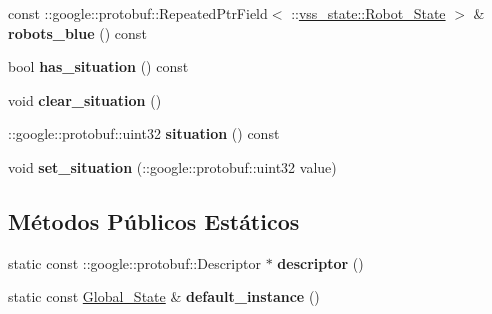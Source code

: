 \begin{DoxyCompactItemize}
\item 
const \+::google\+::protobuf\+::\+Repeated\+Ptr\+Field$<$ \+::\hyperlink{classvss__state_1_1Robot__State}{vss\+\_\+state\+::\+Robot\+\_\+\+State} $>$ \& {\bfseries robots\+\_\+blue} () const \hypertarget{classvss__state_1_1Global__State_ad659e30adf37a0e412765337eb28f233}{}\label{classvss__state_1_1Global__State_ad659e30adf37a0e412765337eb28f233}

\item 
bool {\bfseries has\+\_\+situation} () const \hypertarget{classvss__state_1_1Global__State_a261f48529a5cb4bc9d4cc9ba645e530b}{}\label{classvss__state_1_1Global__State_a261f48529a5cb4bc9d4cc9ba645e530b}

\item 
void {\bfseries clear\+\_\+situation} ()\hypertarget{classvss__state_1_1Global__State_a1b8e5668d373349fa5a7d8bfeb299057}{}\label{classvss__state_1_1Global__State_a1b8e5668d373349fa5a7d8bfeb299057}

\item 
\+::google\+::protobuf\+::uint32 {\bfseries situation} () const \hypertarget{classvss__state_1_1Global__State_a02c6e5b10b81236b46bfce5b2d245d40}{}\label{classvss__state_1_1Global__State_a02c6e5b10b81236b46bfce5b2d245d40}

\item 
void {\bfseries set\+\_\+situation} (\+::google\+::protobuf\+::uint32 value)\hypertarget{classvss__state_1_1Global__State_a111561db5dbd32a5daa13893ddaa297c}{}\label{classvss__state_1_1Global__State_a111561db5dbd32a5daa13893ddaa297c}

\end{DoxyCompactItemize}
\subsection*{Métodos Públicos Estáticos}
\begin{DoxyCompactItemize}
\item 
static const \+::google\+::protobuf\+::\+Descriptor $\ast$ {\bfseries descriptor} ()\hypertarget{classvss__state_1_1Global__State_af5963eb38d472f2508e180fdf42c4a22}{}\label{classvss__state_1_1Global__State_af5963eb38d472f2508e180fdf42c4a22}

\item 
static const \hyperlink{classvss__state_1_1Global__State}{Global\+\_\+\+State} \& {\bfseries default\+\_\+instance} ()\hypertarget{classvss__state_1_1Global__State_a1bf08b600180f360bcd37c58f3e50b16}{}\label{classvss__state_1_1Global__State_a1bf08b600180f360bcd37c58f3e50b16}

\end{DoxyCompactItemize}
